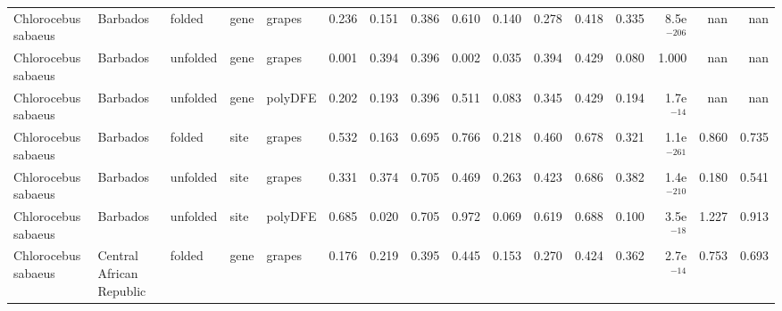 \begin{longtable}{lllllrrrrrrrrrrr}
 Chlorocebus sabaeus &                  Barbados &    folded &  gene &   grapes &                              0.236 &                               0.151 &                 0.386 &                 0.610 &                              0.140 &                               0.278 &                 0.418 &                 0.335 & 8.5e$^{-206}$ &    nan &    nan \\
 Chlorocebus sabaeus &                  Barbados &  unfolded &  gene &   grapes &                              0.001 &                               0.394 &                 0.396 &                 0.002 &                              0.035 &                               0.394 &                 0.429 &                 0.080 &         1.000 &    nan &    nan \\
 Chlorocebus sabaeus &                  Barbados &  unfolded &  gene &  polyDFE &                              0.202 &                               0.193 &                 0.396 &                 0.511 &                              0.083 &                               0.345 &                 0.429 &                 0.194 &  1.7e$^{-14}$ &    nan &    nan \\
 Chlorocebus sabaeus &                  Barbados &    folded &  site &   grapes &                              0.532 &                               0.163 &                 0.695 &                 0.766 &                              0.218 &                               0.460 &                 0.678 &                 0.321 & 1.1e$^{-261}$ &  0.860 &  0.735 \\
 Chlorocebus sabaeus &                  Barbados &  unfolded &  site &   grapes &                              0.331 &                               0.374 &                 0.705 &                 0.469 &                              0.263 &                               0.423 &                 0.686 &                 0.382 & 1.4e$^{-210}$ &  0.180 &  0.541 \\
 Chlorocebus sabaeus &                  Barbados &  unfolded &  site &  polyDFE &                              0.685 &                               0.020 &                 0.705 &                 0.972 &                              0.069 &                               0.619 &                 0.688 &                 0.100 &  3.5e$^{-18}$ &  1.227 &  0.913 \\
 Chlorocebus sabaeus &  Central African Republic &    folded &  gene &   grapes &                              0.176 &                               0.219 &                 0.395 &                 0.445 &                              0.153 &                               0.270 &                 0.424 &                 0.362 &  2.7e$^{-14}$ &  0.753 &  0.693 \\

\end{longtable}
